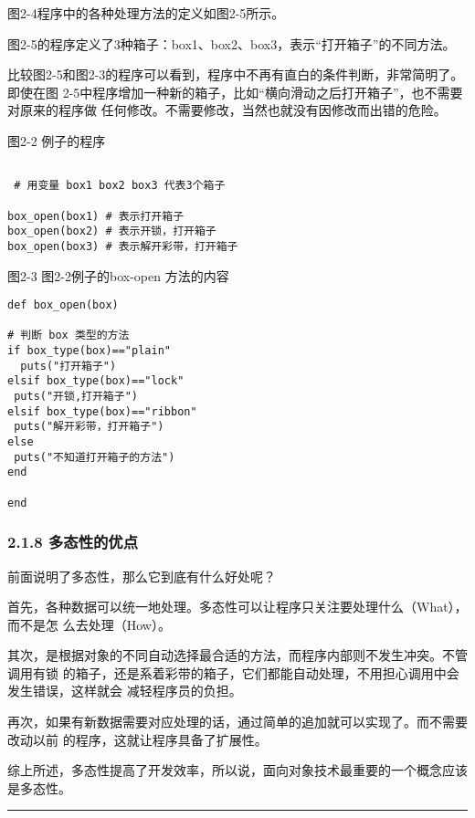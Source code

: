 \documentclass[11pt]{ctexart}
\begin{document}
图2-4程序中的各种处理方法的定义如图2-5所示。

图2-5的程序定义了3种箱子：box1、box2、box3，表示“打开箱子”的不同方法。

比较图2-5和图2-3的程序可以看到，程序中不再有直白的条件判断，非常简明了。即使在图
2-5中程序增加一种新的箱子，比如“横向滑动之后打开箱子”，也不需要对原来的程序做
任何修改。不需要修改，当然也就没有因修改而出错的危险。

图2-2 例子的程序
\lstset{language=org,label= ,caption= ,captionpos=b,numbers=none}
\begin{lstlisting}

 # 用变量 box1 box2 box3 代表3个箱子

box_open(box1) # 表示打开箱子
box_open(box2) # 表示开锁，打开箱子
box_open(box3) # 表示解开彩带，打开箱子

\end{lstlisting}

图2-3 图2-2例子的box-open 方法的内容

\lstset{language=org,label= ,caption= ,captionpos=b,numbers=none}
\begin{lstlisting}
def box_open(box)

# 判断 box 类型的方法
if box_type(box)=="plain"
  puts("打开箱子")
elsif box_type(box)=="lock"
 puts("开锁,打开箱子")
elsif box_type(box)=="ribbon"
 puts("解开彩带，打开箱子")
else
 puts("不知道打开箱子的方法")
end

end
\end{lstlisting}

\subsubsection{2.1.8 多态性的优点}
\label{sec:org29d154a}

前面说明了多态性，那么它到底有什么好处呢？

首先，各种数据可以统一地处理。多态性可以让程序只关注要处理什么（What），而不是怎
么去处理（How）。

其次，是根据对象的不同自动选择最合适的方法，而程序内部则不发生冲突。不管调用有锁
的箱子，还是系着彩带的箱子，它们都能自动处理，不用担心调用中会发生错误，这样就会
减轻程序员的负担。

再次，如果有新数据需要对应处理的话，通过简单的追加就可以实现了。而不需要改动以前
的程序，这就让程序具备了扩展性。

综上所述，多态性提高了开发效率，所以说，面向对象技术最重要的一个概念应该是多态性。

\noindent\rule{\textwidth}{0.5pt}
\end{document}
